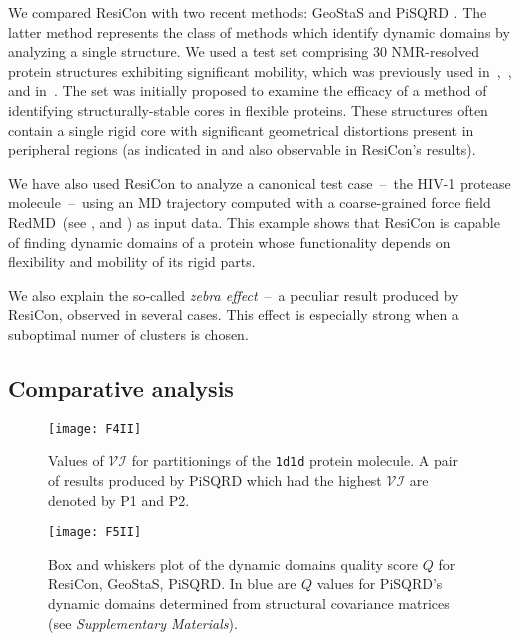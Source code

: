 We compared ResiCon with two recent methods: GeoStaS \cite{romanowska2012determining} and PiSQRD \cite{potestio2009coarse}.
The latter method represents the class of methods which identify dynamic domains by analyzing a single structure.
We used a test set comprising 30 NMR-resolved protein structures exhibiting significant mobility, which was previously used in~\cite{snyder2005clustering},~\cite{kirchner2011objective}, and in~\cite{romanowska2012determining}.
The set was initially proposed to examine the efficacy of a method of identifying structurally-stable cores in flexible proteins.
These structures often contain a single rigid core with significant geometrical distortions present in peripheral regions (as indicated in \cite{snyder2005clustering} and also observable in ResiCon's results). 

We have also used ResiCon to analyze a canonical test case~--~the HIV-1 protease molecule~--~using an MD trajectory computed with a coarse-grained force field RedMD~(see \cite{gorecki36causality}, and \cite{gorecki2009redmd}) as input data.
This example shows that ResiCon is capable of finding dynamic domains of a protein whose functionality depends on flexibility and mobility of its rigid parts.

We also explain the so-called \emph{zebra effect}~--~a peculiar result produced by ResiCon, observed in several cases.
This effect is especially strong when a suboptimal numer of clusters is chosen.

\subsection*{Comparative analysis}



\begin{figure}
\centering
\texttt{[image: F4II]}
\caption{Values of $\mathcal{VI}$ for partitionings of the \texttt{1d1d} protein molecule.
A pair of results produced by PiSQRD which had the highest $\mathcal{VI}$ are denoted by P1 and P2.}
\label{comparison}
\end{figure}

\begin{figure*}
\centering
\texttt{[image: F5II]}
\caption{Box and whiskers plot of the dynamic domains quality score $Q$ for ResiCon, GeoStaS, PiSQRD.
In blue are $Q$ values for PiSQRD's dynamic domains determined from structural covariance matrices (see \emph{Supplementary Materials}).}
\label{boxWhiskers}
\end{figure*}

